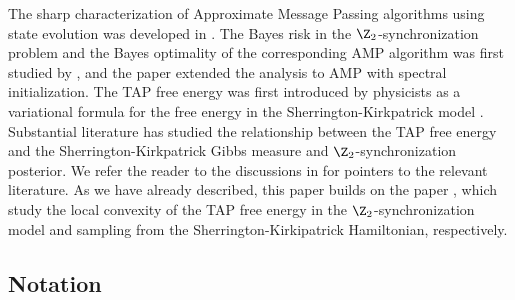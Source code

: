\documentclass[]{article}
\begin{document}
The sharp characterization of Approximate Message Passing algorithms using state evolution was developed in \cite{Bolthausen2014,bayatiMontanari2010,javanmardMontanari2013,berthier2019}.
The Bayes risk in the $\Z_2$-synchronization problem and the Bayes optimality of the corresponding AMP algorithm was first studied by \cite{deshpande2016},
and the paper \cite{montanariVenkatarmanan2021} extended the analysis to AMP with spectral initialization.
The TAP free energy was first introduced by physicists as a variational formula for the free energy in the Sherrington-Kirkpatrick model \cite{thouless1977}. 
Substantial literature has studied the relationship between the TAP free energy and the Sherrington-Kirkpatrick Gibbs measure and $\Z_2$-synchronization posterior.
We refer the reader to the discussions in \cite{fanMeiMontanari2021,celentanoFanMei2021} for pointers to the relevant literature.
As we have already described, this paper builds on the paper \cite{celentanoFanMei2021,AlaouiMontanariSelke2022},
which study the local convexity of the TAP free energy in the $\Z_2$-synchronization model and sampling from the Sherrington-Kirkipatrick Hamiltonian, respectively.

\subsection{Notation}
\label{sec:notation}
\end{document}
